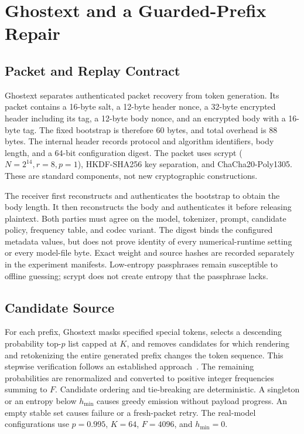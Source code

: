 \section{Ghostext and a Guarded-Prefix Repair}
\label{sec:protocol-details}

\subsection{Packet and Replay Contract}

Ghostext separates authenticated packet recovery from token generation. Its
packet contains a 16-byte salt, a 12-byte header nonce, a 32-byte encrypted
header including its tag, a 12-byte body nonce, and an encrypted body with a
16-byte tag. The fixed bootstrap is therefore 60 bytes, and total overhead is
88 bytes. The internal header records protocol and algorithm identifiers,
body length, and a 64-bit configuration digest. The packet uses scrypt
($N=2^{14},r=8,p=1$), HKDF-SHA256 key separation, and ChaCha20-Poly1305.
These are standard components, not new cryptographic constructions.

The receiver first reconstructs and authenticates the bootstrap to obtain the
body length. It then reconstructs the body and authenticates it before releasing
plaintext. Both parties must agree on the model, tokenizer, prompt, candidate
policy, frequency table, and codec variant. The digest binds the configured
metadata values, but does not prove identity of every numerical-runtime setting
or every model-file byte. Exact weight and source hashes are recorded separately
in the experiment manifests. Low-entropy passphrases remain susceptible to
offline guessing; scrypt does not create entropy that the passphrase lacks.

\subsection{Candidate Source}

For each prefix, Ghostext masks specified special tokens, selects a descending
probability top-$p$ list capped at $K$, and removes candidates for which rendering
and retokenizing the entire generated prefix changes the token sequence. This
stepwise verification follows an established approach~\cite{yan2025tokenization}.
The remaining probabilities are renormalized and converted to positive integer
frequencies summing to $F$. Candidate ordering and tie-breaking are deterministic.
A singleton or an entropy below $h_{\min}$ causes greedy emission without
payload progress. An empty stable set causes failure or a fresh-packet retry.
The real-model configurations use $p=0.995$, $K=64$, $F=4096$, and $h_{\min}=0$.

